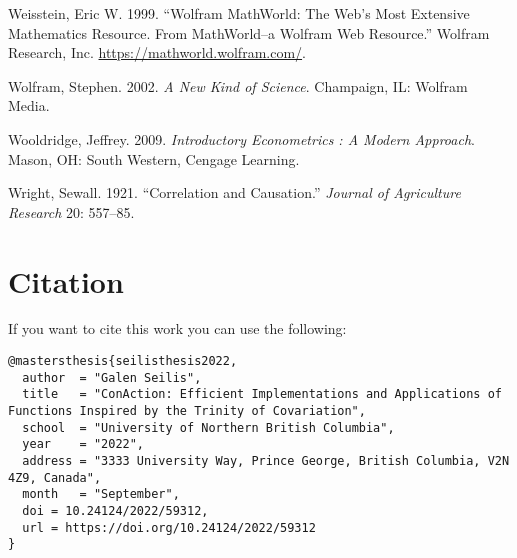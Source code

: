 \documentclass[
  letterpaper,
  DIV=11,
  numbers=noendperiod]{scrreprt}
\newlength{\cslhangindent}
\newenvironment{CSLReferences}[2] %
 {\begin{list}{}{%
  \setlength{\itemindent}{0pt}
  \setlength{\leftmargin}{0pt}
  \setlength{\parsep}{0pt}
  \ifodd #1
   \setlength{\leftmargin}{\cslhangindent}
   \setlength{\itemindent}{-1\cslhangindent}
  \fi
  \setlength{\itemsep}{#2\baselineskip}}}
 {\end{list}}
\begin{document}
\begin{CSLReferences}{1}{0}
Weisstein, Eric W. 1999. {``Wolfram MathWorld: The Web's Most Extensive
Mathematics Resource. From MathWorld--a Wolfram Web Resource.''} Wolfram
Research, Inc. \url{https://mathworld.wolfram.com/}.

Wolfram, Stephen. 2002. \emph{A New Kind of Science}. Champaign, IL:
Wolfram Media.

Wooldridge, Jeffrey. 2009. \emph{Introductory Econometrics : A Modern
Approach}. Mason, OH: South Western, Cengage Learning.

Wright, Sewall. 1921. {``Correlation and Causation.''} \emph{Journal of
Agriculture Research} 20: 557--85.

\end{CSLReferences}


\chapter*{Citation}\label{citation}


If you want to cite this work you can use the following:

\begin{verbatim}
@mastersthesis{seilisthesis2022,
  author  = "Galen Seilis",
  title   = "ConAction: Efficient Implementations and Applications of Functions Inspired by the Trinity of Covariation",
  school  = "University of Northern British Columbia",
  year    = "2022",
  address = "3333 University Way, Prince George, British Columbia, V2N 4Z9, Canada",
  month   = "September",
  doi = 10.24124/2022/59312,
  url = https://doi.org/10.24124/2022/59312
}
\end{verbatim}
\end{document}
